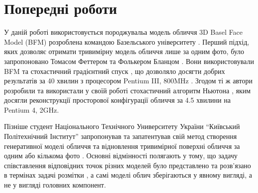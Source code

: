 \section{Попередні роботи}

У даній роботі використовується породжувальа модель обличчя
3D Basel Face Model (BFM)
розроблена командою Базельського університету
\cite{bfm09}.
Перший підхід,
яких дозволяє отримати тривимірну модель обличчя лише за одним фото,
було запропоновано Томасом Феттером та Фолькером Бланцом
\cite{blanz:vetter:1999}.
Вони використовували BFM та стохастичний градієнтний спуск \cite{sgd:1998},
що дозволяло досягти добрих результатів за 40 хвилин з процесором
Pentium III, 800MHz \cite{blanz:romdhani:vetter}.
Згодом ті ж автори розробили та використали у своїй роботі
стохастичний алгоритм Ньютона \cite{blanz:vetter:2003},
яким досягли реконструкції просторової конфігурації обличчя за 4.5 хвилини на
Pentium 4, 2GHz.

Пізніше студент Національного Технічного Университету України
``Київський Політехнічний Інститут'' запропонував та запатентував
свій метод створення генеративної моделі обличчя та відновлення
тривимірної поверхні обличчя за одним або кількома фото \cite{tyshchenko2011}.
Основні відмінності полягають у тому,
що задачу співставлення відповідних точок різних моделей
було представлено та розв'язано в термінах задачі розмітки
\cite{Rossi:2006:HCP:1207782},
а самі моделі облич зберігаються у явному вигляді,
а не у вигляді головних компонент.
